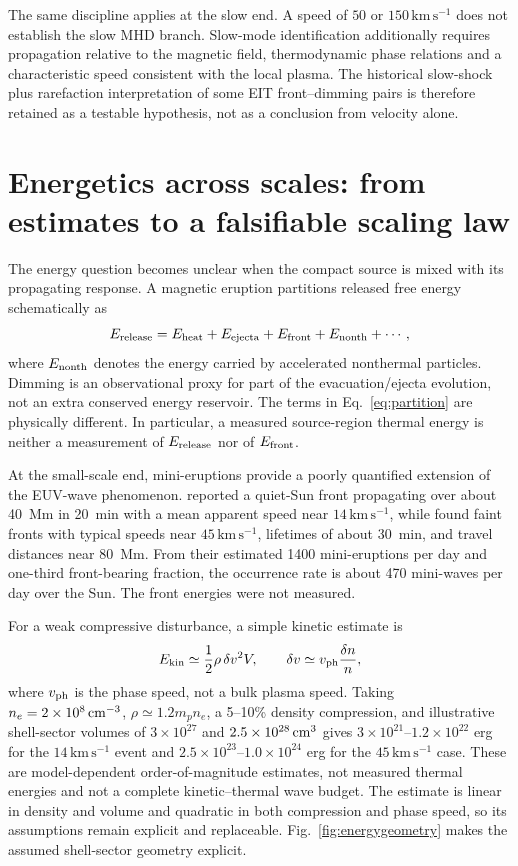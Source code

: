 \documentclass[11pt]{article}
\let\textcite\citet
\newcommand{\kms}{\mathrm{km\,s^{-1}}}
\newcommand{\Efront}{E_{\rm front}}
\newcommand{\Erelease}{E_{\rm release}}
\begin{document}
The same discipline applies at the slow end. A speed of $50$ or $150\,\kms$ does not establish the slow MHD branch. Slow-mode identification additionally requires propagation relative to the magnetic field, thermodynamic phase relations and a characteristic speed consistent with the local plasma. The historical slow-shock plus rarefaction interpretation of some EIT front--dimming pairs is therefore retained as a testable hypothesis, not as a conclusion from velocity alone.

\section{Energetics across scales: from estimates to a falsifiable scaling law}
The energy question becomes unclear when the compact source is mixed with its propagating response. A magnetic eruption partitions released free energy schematically as
\begin{equation}
 \Erelease=E_{\rm heat}+E_{\rm ejecta}+\Efront+E_{\rm nonth}+\cdots,
 \label{eq:partition}
\end{equation}
where $E_{\rm nonth}$ denotes the energy carried by accelerated nonthermal particles. Dimming is an observational proxy for part of the evacuation/ejecta evolution, not an extra conserved energy reservoir. The terms in Eq.~\eqref{eq:partition} are physically different. In particular, a measured source-region thermal energy is neither a measurement of $\Erelease$ nor of $\Efront$.

At the small-scale end, mini-eruptions provide a poorly quantified extension of the EUV-wave phenomenon. \textcite{Podladchikova2010} reported a quiet-Sun front propagating over about 40~Mm in 20~min with a mean apparent speed near $14\,\kms$, while \textcite{Innes2009} found faint fronts with typical speeds near $45\,\kms$, lifetimes of about 30~min, and travel distances near 80~Mm. From their estimated 1400 mini-eruptions per day and one-third front-bearing fraction, the occurrence rate is about 470 mini-waves per day over the Sun. The front energies were not measured.

For a weak compressive disturbance, a simple kinetic estimate is
\begin{equation}
 E_{\rm kin}\simeq\frac{1}{2}\rho\,\delta v^2V,
 \qquad
 \delta v\simeq v_{\rm ph}\frac{\delta n}{n},
 \label{eq:weakenergy}
\end{equation}
where $v_{\rm ph}$ is the phase speed, not a bulk plasma speed. Taking $n_e=2\times10^8\,{\rm cm^{-3}}$, $\rho\simeq1.2m_p n_e$, a 5--10\% density compression, and illustrative shell-sector volumes of $3\times10^{27}$ and $2.5\times10^{28}\,{\rm cm^3}$ gives $3\times10^{21}$--$1.2\times10^{22}$ erg for the $14\,\kms$ event and $2.5\times10^{23}$--$1.0\times10^{24}$ erg for the $45\,\kms$ case. These are model-dependent order-of-magnitude estimates, not measured thermal energies and not a complete kinetic--thermal wave budget. The estimate is linear in density and volume and quadratic in both compression and phase speed, so its assumptions remain explicit and replaceable. Fig.~\ref{fig:energygeometry} makes the assumed shell-sector geometry explicit.
\end{document}
